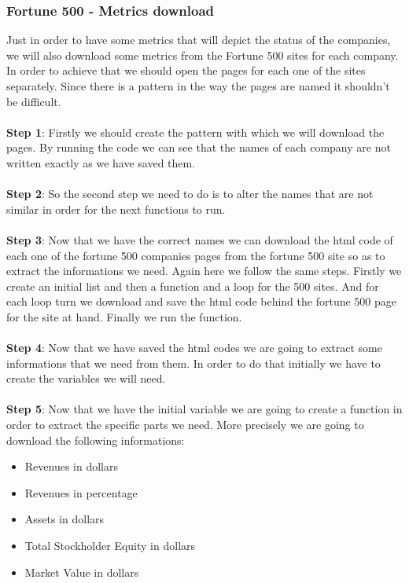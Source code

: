 \documentclass{article}
\begin{document}
\subsubsection{Fortune 500 - Metrics download}
Just in order to have some metrics that will depict the status of the companies, we will also download some metrics from the Fortune 500 sites for each company.\cite{key35} In order to achieve that we should open the pages for each one of the sites separately. Since there is a pattern in the way the pages are named it shouldn't be difficult.\\\\
\textbf{Step 1}: Firstly we should create the pattern with which we will download the pages. By running the code we can see that the names of each company are not written exactly as we have saved them.\\\\
\textbf{Step 2}: So the second step we need to do is to alter the names that are not similar in order for the next functions to run.\\\\
\textbf{Step 3}: Now that we have the correct names we can download the html code of each one of the fortune 500 companies pages from the fortune 500 site so as to extract the informations we need. Again here we follow the same steps. Firstly we create an initial list and then a function and a loop for the 500 sites. And for each loop turn we download and save the html code behind the fortune 500 page for the site at hand. Finally we run the function.\\\\
\textbf{Step 4}: Now that we have saved the html codes we are going to extract some informations that we need from them. In order to do that initially we have to create the variables we will need.\\\\
\textbf{Step 5}: Now that we have the initial variable we are going to create a function in order to extract the specific parts we need. More precisely we are going to download the following informations:
\begin{itemize}
\item Revenues in dollars
\item Revenues in percentage
\item Assets in dollars
\item Total Stockholder Equity in dollars
\item Market Value in dollars
\end{itemize}
\end{document}
